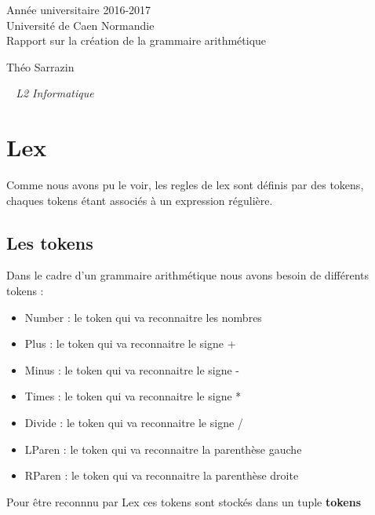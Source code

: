 \documentclass[a4paper,12pt]{article}
\begin{document}
\begin{titlepage}
	\begin{center}
		\Large{Année universitaire 2016-2017}\\
		\Large{Université de Caen Normandie}\\[1cm]
		
		\huge{Rapport sur la création de la grammaire arithmétique}\\
		\vspace{3cm}
		
		Théo Sarrazin
		
	\normalsize{\textit{ ~ L2 Informatique}}\\
		\medskip
		\vspace{2cm}
				
	\end{center}
\end{titlepage}

\tableofcontents
\newpage

\section{Lex}
	
	Comme nous avons pu le voir, les regles de lex sont définis par des tokens, chaques tokens étant associés à un expression régulière. 

	\subsection{Les tokens}

		Dans le cadre d'un grammaire arithmétique nous avons besoin de différents tokens : 
		\begin{itemize}
			\item Number : le token qui va reconnaitre les nombres
			\item Plus : le token qui va reconnaitre le signe +
			\item Minus : le token qui va reconnaitre le signe -
			\item Times : le token qui va reconnaitre le signe *
			\item Divide : le token qui va reconnaitre le signe /
			\item LParen : le token qui va reconnaitre la parenthèse gauche
			\item RParen : le token qui va reconnaitre la parenthèse droite
		\end{itemize}

		Pour être reconnnu par Lex ces tokens sont stockés dans un tuple \textbf{tokens} 
\end{document}
